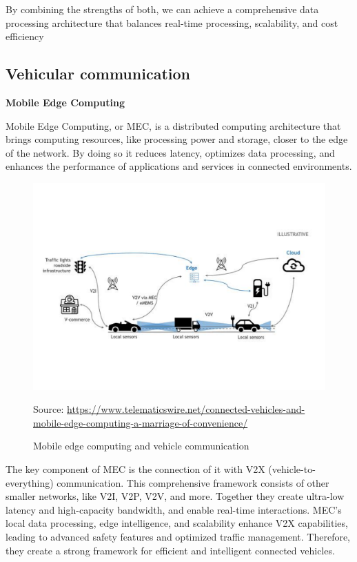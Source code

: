 \documentclass[10pt,oneside,english,a4paper]{article}
\begin{document}
\par By combining the strengths of both, we can achieve a comprehensive data processing architecture that balances real-time processing, scalability, and cost efficiency
\cite{understanding, AIandIoT}

\subsection{Vehicular communication}
\textbf{Mobile Edge Computing} 
\par Mobile Edge Computing, or MEC, is a distributed computing architecture that brings computing resources, like processing power and storage, closer to the edge of the network. By doing so it reduces latency, optimizes data processing, and enhances the performance of applications and services in connected environments.

\begin{figure}[!h]
\centering
\includegraphics[scale=0.5]{Edgecomputing.pdf}
\caption{Mobile edge computing and vehicle communication}
{Source: \url{https://www.telematicswire.net/connected-vehicles-and-mobile-edge-computing-a-marriage-of-convenience/}}
\label{fig:p_MEC}
\end{figure}

\par The key component of MEC is the connection of it with V2X (vehicle-to-everything) communication. This comprehensive framework consists of other smaller networks, like V2I, V2P, V2V, and more. Together they create ultra-low latency and high-capacity bandwidth, and enable real-time interactions. MEC's local data processing, edge intelligence, and scalability enhance V2X capabilities, leading to advanced safety features and optimized traffic management. Therefore, they create a strong framework for efficient and intelligent connected vehicles.
\cite{Taskoffloading, understanding}
\end{document}
